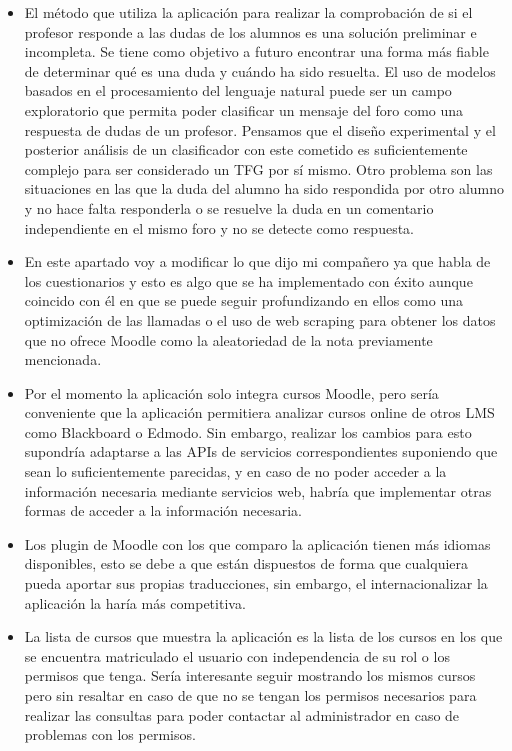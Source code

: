 \begin{itemize}
	\item
	El método que utiliza la aplicación para realizar la comprobación de si el profesor responde a las dudas de los alumnos es una solución preliminar e incompleta. Se tiene como objetivo a futuro encontrar una forma más fiable de determinar qué es una duda y cuándo ha sido resuelta.
	El uso de modelos basados en el procesamiento del lenguaje natural puede ser un campo exploratorio que permita poder clasificar un mensaje del foro como una respuesta de dudas de un profesor. Pensamos que el diseño experimental y el posterior análisis de un clasificador con este cometido es suficientemente complejo para ser considerado un TFG por sí mismo. Otro problema son las situaciones en las que la duda del alumno ha sido respondida por otro alumno y no hace falta responderla o se resuelve la duda en un comentario independiente en el mismo foro y no se detecte como respuesta.
	\item
	En este apartado voy a modificar lo que dijo mi compañero ya que habla de los cuestionarios y esto es algo que se ha implementado con éxito aunque coincido con él en que se puede seguir profundizando en ellos como una optimización de las llamadas o el uso de web scraping para obtener los datos que no ofrece Moodle como la aleatoriedad de la nota previamente mencionada.
	\item
	Por el momento la aplicación solo integra cursos Moodle, pero sería conveniente que la aplicación permitiera analizar cursos online de otros LMS como Blackboard o Edmodo. Sin embargo, realizar los cambios para esto supondría adaptarse a las APIs de servicios correspondientes suponiendo que sean lo suficientemente parecidas, y en caso de no poder acceder a la información necesaria mediante servicios web, habría que implementar otras formas de acceder a la información necesaria.
	\item
	Los plugin de Moodle con los que comparo la aplicación tienen más idiomas disponibles, esto se debe a que están dispuestos de forma que cualquiera pueda aportar sus propias traducciones, sin embargo, el internacionalizar la aplicación la haría más competitiva.
	\item
	La lista de cursos que muestra la aplicación es la lista de los cursos en los que se encuentra matriculado el usuario con independencia de su rol o los permisos que tenga. Sería interesante seguir mostrando los mismos cursos pero sin resaltar en caso de que no se tengan los permisos necesarios para realizar las consultas para poder contactar al administrador en caso de problemas con los permisos.

\end{itemize}
